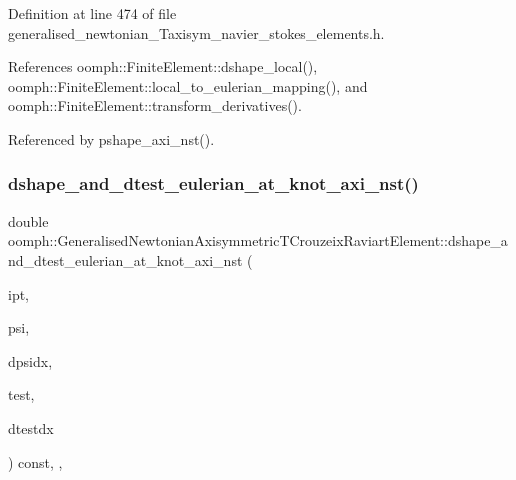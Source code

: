 Definition at line 474 of file generalised\+\_\+newtonian\+\_\+\+Taxisym\+\_\+navier\+\_\+stokes\+\_\+elements.\+h.



References oomph\+::\+Finite\+Element\+::dshape\+\_\+local(), oomph\+::\+Finite\+Element\+::local\+\_\+to\+\_\+eulerian\+\_\+mapping(), and oomph\+::\+Finite\+Element\+::transform\+\_\+derivatives().



Referenced by pshape\+\_\+axi\+\_\+nst().

\mbox{\label{classoomph_1_1GeneralisedNewtonianAxisymmetricTCrouzeixRaviartElement_a6c3359adf54ac062b1a5991ef917de4f}} 
\subsubsection{\texorpdfstring{dshape\+\_\+and\+\_\+dtest\+\_\+eulerian\+\_\+at\+\_\+knot\+\_\+axi\+\_\+nst()}{dshape\_and\_dtest\_eulerian\_at\_knot\_axi\_nst()}\hspace{0.1cm}{\footnotesize\ttfamily [1/2]}}
{\footnotesize\ttfamily double oomph\+::\+Generalised\+Newtonian\+Axisymmetric\+T\+Crouzeix\+Raviart\+Element\+::dshape\+\_\+and\+\_\+dtest\+\_\+eulerian\+\_\+at\+\_\+knot\+\_\+axi\+\_\+nst (\begin{DoxyParamCaption}\item[{const unsigned \&}]{ipt,  }\item[{\hyperlink{classoomph_1_1Shape}{Shape} \&}]{psi,  }\item[{\hyperlink{classoomph_1_1DShape}{D\+Shape} \&}]{dpsidx,  }\item[{\hyperlink{classoomph_1_1Shape}{Shape} \&}]{test,  }\item[{\hyperlink{classoomph_1_1DShape}{D\+Shape} \&}]{dtestdx }\end{DoxyParamCaption}) const\hspace{0.3cm}{\ttfamily [inline]}, {\ttfamily [protected]}, {\ttfamily [virtual]}}



